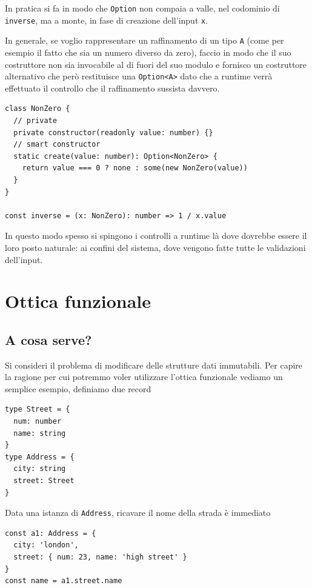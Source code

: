 \documentclass[12pt]{article}
\begin{document}
In pratica si fa in modo che \texttt{Option} non compaia a valle, nel codominio di \texttt{inverse},
ma a monte, in fase di creazione dell'input \texttt{x}.

In generale, se voglio rappresentare un raffinamento di un tipo \texttt{A} (come per esempio il fatto che sia un numero diverso da zero),
faccio in modo che il suo costruttore non sia invocabile al di fuori del suo modulo e fornisco un costruttore alternativo
che però restituisce una \texttt{Option<A>} dato che a runtime verrà effettuato il controllo che il raffinamento sussista davvero.

\begin{verbatim}
class NonZero {
  // private
  private constructor(readonly value: number) {}
  // smart constructor
  static create(value: number): Option<NonZero> {
    return value === 0 ? none : some(new NonZero(value))
  }
}

const inverse = (x: NonZero): number => 1 / x.value
\end{verbatim}

In questo modo spesso si spingono i controlli a runtime là dove dovrebbe essere il loro posto naturale: ai confini del sistema,
dove vengono fatte tutte le validazioni dell'input.

\section{Ottica funzionale}

\subsection{A cosa serve?}

Si consideri il problema di modificare delle strutture dati immutabili.
Per capire la ragione per cui potremmo voler utilizzare l'ottica funzionale vediamo un semplice esempio, definiamo due record

\begin{verbatim}
type Street = {
  num: number
  name: string
}
type Address = {
  city: string
  street: Street
}
\end{verbatim}

Data una istanza di \texttt{Address}, ricavare il nome della strada è immediato

\begin{verbatim}
const a1: Address = {
  city: 'london',
  street: { num: 23, name: 'high street' }
}
const name = a1.street.name
\end{verbatim}
\end{document}
